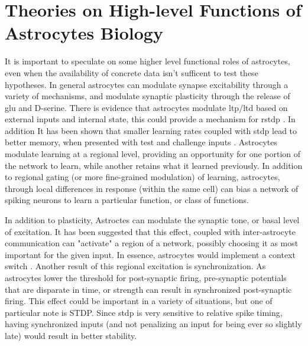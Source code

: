     
    \section{Theories on High-level Functions of Astrocytes Biology}
    
    It is important to speculate on some higher level functional roles of
    astrocytes, even when the availability of concrete data isn't sufficent to
    test these hypotheses. In general astrocytes can modulate synapse
    excitability through a variety of mechanisms, and modulate synaptic
    plasticity through the release of \gls{glu} and D-serine. There is evidence
    that astrocytes modulate \gls{ltp}/\gls{ltd} based on external inputs and internal
    state, this could provide a mechanism for \gls{rstdp}
    \parencite{min_2012}. In addition It has been shown that smaller learning rates
    coupled with \gls{stdp} lead to better memory, when presented with test and
    challenge inputs \parencite{van-rossum_2012}. Astrocytes modulate learning at a
    regional level, providing an opportunity for one portion of the network to
    learn, while another retains what it learned previously. In addition to
    regional gating (or more fine-grained modulation) of learning, astrocytes,
    through local differences in response (within the same cell) can bias a
    network of spiking neurons to learn a particular function, or class of
    functions.

    In addition to plasticity, Astroctes can modulate the synaptic tone, or
    basal level of excitation. It has been suggested that this effect, coupled
    with inter-astrocyte communication can "activate" a region of a network,
    possibly choosing it as most important for the given input. In essence,
    astrocytes would implement a context switch \parencite{min_2012,
      gordleeva_2021}. Another result of this regional excitation is
    synchronization. As astrocytes lower the threshold for post-synaptic firing,
    pre-synaptic potentials that are disparate in time, or strength can result
    in synchronized post-synaptic firing. This effect could be important in a
    variety of situations, but one of particular note is STDP. Since \gls{stdp}
    is very sensitive to relative spike timing, having synchronized inputs (and
    not penalizing an input for being ever so slightly late) would result in
    better stability.

